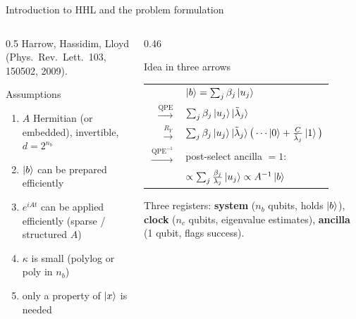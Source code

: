 \documentclass[aspectratio=169,11pt]{beamer}
\newcommand{\key}[1]{{\color{qdark}\textbf{#1}}}
\newcommand{\lt}{\tilde\lambda}
\begin{document}
\begin{frame}{Introduction to HHL and the problem formulation}
  \begin{columns}[T]
    \begin{column}{0.5\textwidth}
      \small Harrow, Hassidim, Lloyd (Phys.\ Rev.\ Lett.\ 103, 150502, 2009).
      \begin{block}{Assumptions}
        \begin{enumerate}
          \item $A$ Hermitian (or embedded), invertible, $d = 2^{n_b}$
          \item $\ket b$ can be prepared efficiently
          \item $e^{iAt}$ can be applied efficiently (sparse / structured $A$)
          \item $\kappa$ is small (polylog or poly in $n_b$)
          \item only a property of $\ket x$ is needed
        \end{enumerate}
      \end{block}
    \end{column}
    \begin{column}{0.46\textwidth}
      \begin{block}{Idea in three arrows}
        \small
        \begin{tabular}{@{}r@{\ }l@{}}
          & $\ket b = \sum_j\beta_j\ket{u_j}$\\
          $\xrightarrow{\text{QPE}}$ & $\sum_j\beta_j\ket{u_j}\ket{\lt_j}$\\
          $\xrightarrow{R_Y}$ & $\sum_j\beta_j\ket{u_j}\ket{\lt_j}\big(\cdots\ket0 + \frac{C}{\lt_j}\ket1\big)$\\
          $\xrightarrow{\text{QPE}^{-1}}$ & post-select ancilla $= 1$:\\
          & $\propto\sum_j\frac{\beta_j}{\lambda_j}\ket{u_j} \propto A^{-1}\ket b$
        \end{tabular}
      \end{block}
      \small Three registers: \key{system} ($n_b$ qubits, holds $\ket b$), \key{clock} ($n_c$ qubits, eigenvalue estimates),
      \key{ancilla} (1 qubit, flags success).
    \end{column}
  \end{columns}
\end{frame}
\end{document}
